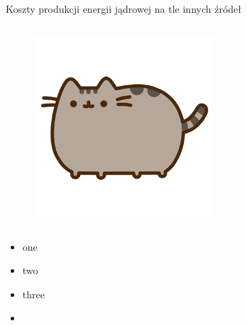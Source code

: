 \begin{columnframe}{Koszty produkcji energii jądrowej na tle innych źródeł}
    \begin{column}{0.5\textwidth}
        \begin{figure}
            \centering
            \includegraphics[width=0.6\textwidth, frame]{images/pusheen.png}
        \end{figure}
    \end{column}
    \begin{column}{0.5\textwidth}
        \begin{itemize}
            \item one \keV
            \item two \MeV
            \item three \GeV
            \item \aegis
        \end{itemize}
    \end{column}
\end{columnframe}


